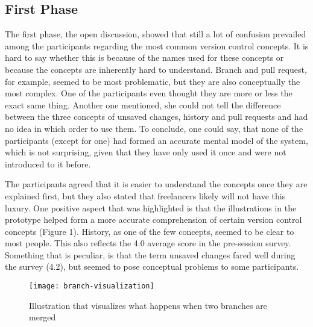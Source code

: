 \subsection{First Phase}
The first phase, the open discussion, showed that still a lot of confusion prevailed among the participants regarding the most common version control concepts. It is hard to say whether this is because of the names used for these concepts or because the concepts are inherently hard to understand. Branch and pull request, for example, seemed to be most problematic, but they are also conceptually the most complex. One of the participants even thought they are more or less the exact same thing. Another one mentioned, she could not tell the difference between the three concepts of unsaved changes, history and pull requests and had no idea in which order to use them. To conclude, one could say, that none of the participants (except for one) had formed an accurate mental model of the system, which is not surprising, given that they have only used it once and were not introduced to it before.

The participants agreed that it is easier to understand the concepts once they are explained first, but they also stated that freelancers likely will not have this luxury. One positive aspect that was highlighted is that the illustrations in the prototype helped form a more accurate comprehension of certain version control concepts (Figure 1). History, as one of the few concepts, seemed to be clear to most people. This also reflects the 4.0 average score in the pre-session survey. Something that is peculiar, is that the term unsaved changes fared well during the survey (4.2), but seemed to pose conceptual problems to some participants.

\begin{figure}[h!]
 \centering
 \texttt{[image: branch-visualization]}
 \caption{Illustration that visualizes what happens when two branches are merged}
 \label{fig:branch-visualization}
\end{figure}

